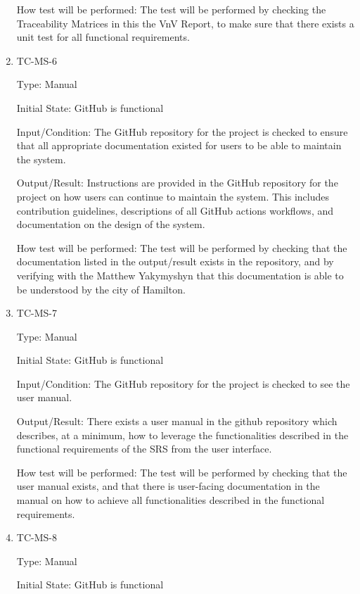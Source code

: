 \documentclass[12pt, titlepage]{article}
\begin{document}
\begin{enumerate}
    How test will be performed: The test will be performed by
    checking the Traceability Matrices in this the VnV Report, to
    make sure that there exists a unit test for all functional requirements.

  \item{TC-MS-6\\}

    Type: Manual

    Initial State: GitHub is functional

    Input/Condition: The GitHub repository for the project is checked
    to ensure that all appropriate documentation existed for users to
    be able to maintain the system.

    Output/Result: Instructions are provided in the GitHub repository
    for the project on how users can continue to maintain the system.
    This includes contribution guidelines, descriptions of all
    GitHub actions workflows, and documentation on the design of the system.

    How test will be performed: The test will be performed by
    checking that the documentation listed in the output/result
    exists in the repository, and by verifying with the Matthew
    Yakymyshyn that this documentation is able to be understood by
    the city of Hamilton.

  \item{TC-MS-7\\}

    Type: Manual

    Initial State: GitHub is functional

    Input/Condition: The GitHub repository for the project is checked
    to see the user manual.

    Output/Result: There exists a user manual in the github
    repository which describes, at a minimum, how to leverage the
    functionalities described in the functional requirements of the
    SRS from the user interface.

    How test will be performed: The test will be performed by
    checking that the user manual exists, and that there is
    user-facing documentation in the manual on how to achieve all
    functionalities described in the functional requirements.

  \item{TC-MS-8\\}

    Type: Manual

    Initial State: GitHub is functional


\end{enumerate}
\end{document}
